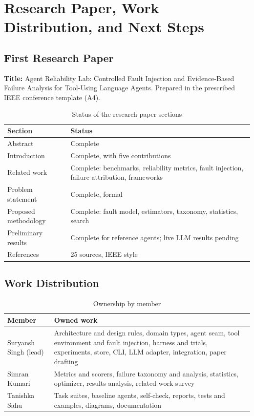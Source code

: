 \documentclass[12pt,a4paper,oneside]{report}
\begin{document}
\chapter{Research Paper, Work Distribution, and Next Steps}

\section{First Research Paper}
\textbf{Title:} Agent Reliability Lab: Controlled Fault Injection and Evidence-Based
Failure Analysis for Tool-Using Language Agents. Prepared in the prescribed IEEE
conference template (A4).
\begin{table}[H]
\centering
\caption{Status of the research paper sections}
\begin{tabularx}{\linewidth}{lY}
\toprule
\textbf{Section} & \textbf{Status} \\
\midrule
Abstract & Complete \\
Introduction & Complete, with five contributions \\
Related work & Complete: benchmarks, reliability metrics, fault injection, failure attribution, frameworks \\
Problem statement & Complete, formal \\
Proposed methodology & Complete: fault model, estimators, taxonomy, statistics, search \\
Preliminary results & Complete for reference agents; live LLM results pending \\
References & 25 sources, IEEE style \\
\bottomrule
\end{tabularx}
\end{table}

\section{Work Distribution}
\begin{table}[H]
\centering
\caption{Ownership by member}
\begin{tabularx}{\linewidth}{lY}
\toprule
\textbf{Member} & \textbf{Owned work} \\
\midrule
Suryansh Singh (lead) & Architecture and design rules, domain types, agent seam, tool environment and fault injection, harness and trials, experiments, store, CLI, LLM adapter, integration, paper drafting \\
Simran Kumari & Metrics and scorers, failure taxonomy and analysis, statistics, optimizer, results analysis, related-work survey \\
Tanishka Sahu & Task suites, baseline agents, self-check, reports, tests and examples, diagrams, documentation \\
\bottomrule
\end{tabularx}
\end{table}
\end{document}
